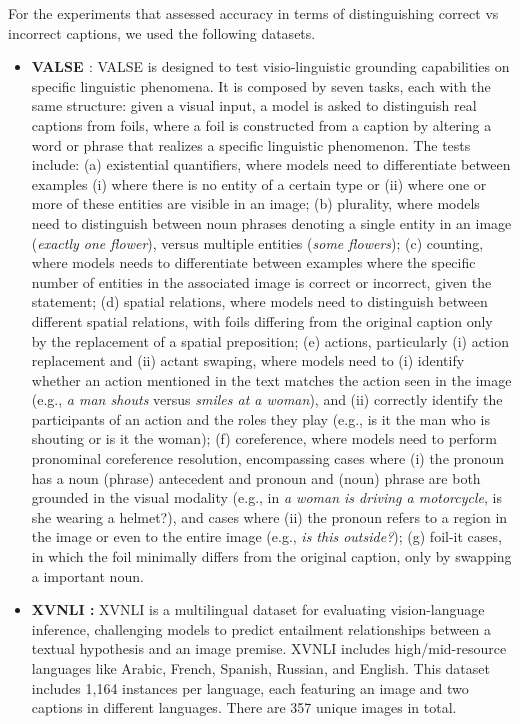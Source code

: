For the experiments that assessed accuracy in terms of distinguishing correct vs incorrect captions, we used the following datasets.
\begin{itemize}\setlength\itemsep{0em}
\item \textbf{VALSE \cite{parcalabescu2022valse}}: VALSE is designed to test visio-linguistic grounding capabilities on specific linguistic phenomena. It is composed by seven tasks, each with the same structure: given a visual input, a model is asked to distinguish real captions from foils, where a foil is constructed from a caption by altering a word or phrase that realizes a specific linguistic phenomenon. The tests include: (a) existential quantifiers, where models need to differentiate between examples (i) where there is no entity of a certain type or (ii) where one or more of these entities are visible in an image; (b) plurality, where models need to distinguish between noun phrases denoting a single entity in an image ({\it exactly one flower}), versus multiple entities ({\it some flowers}); (c) counting, where models needs to differentiate between examples where the specific number of entities in the associated image is correct or incorrect, given the statement; (d) spatial relations, where models need to distinguish between different spatial relations, with foils differing from the original caption only by the replacement of a spatial preposition; (e) actions, particularly (i) action replacement and (ii) actant swaping, where models need to (i) identify whether an action mentioned in the text matches the action seen in the image (e.g., {\it a man shouts} versus {\it smiles at a woman}), and (ii) correctly identify the participants of an action and the roles they play (e.g., is it the man who is shouting or is it the woman); (f) coreference, where models need to perform pronominal coreference resolution, encompassing cases where (i) the pronoun has a noun (phrase) antecedent and pronoun and (noun) phrase are both grounded in the visual modality (e.g., in {\it a woman is driving a motorcycle}, is she wearing a helmet?), and cases where (ii) the pronoun refers to a region in the image or even to the entire image (e.g., {\it is this outside?}); (g) foil-it cases, in which the foil minimally differs from the original caption, only by swapping a important noun.

\item \textbf{XVNLI \cite{bugliarello2022iglue}: } XVNLI is a multilingual dataset for evaluating vision-language inference, challenging models to predict entailment relationships between a textual hypothesis and an image premise. XVNLI includes high/mid-resource languages like Arabic, French, Spanish, Russian, and English. This dataset includes 1,164 instances per language, each featuring an image and two captions in different languages. There are 357 unique images in total.


\end{itemize}
